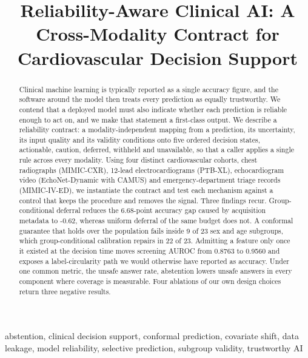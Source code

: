 \documentclass[conference,a4paper]{IEEEtran}
\begin{document}
\title{Reliability-Aware Clinical AI: A Cross-Modality Contract for Cardiovascular Decision Support}

\author{
}

\maketitle

\begin{abstract}
Clinical machine learning is typically reported as a single accuracy figure, and the software around the model then treats every prediction as equally trustworthy. We contend that a deployed model must also indicate whether each prediction is reliable enough to act on, and we make that statement a first-class output. We describe a reliability contract: a modality-independent mapping from a prediction, its uncertainty, its input quality and its validity conditions onto five ordered decision states, actionable, caution, deferred, withheld and unavailable, so that a caller applies a single rule across every modality. Using four distinct cardiovascular cohorts, chest radiographs (MIMIC-CXR), 12-lead electrocardiograms (PTB-XL), echocardiogram video (EchoNet-Dynamic with CAMUS) and emergency-department triage records (MIMIC-IV-ED), we instantiate the contract and test each mechanism against a control that keeps the procedure and removes the signal. Three findings recur. Group-conditional deferral reduces the 6.68-point accuracy gap caused by acquisition metadata to -0.62, whereas uniform deferral of the same budget does not. A conformal guarantee that holds over the population fails inside 9 of 23 sex and age subgroups, which group-conditional calibration repairs in 22 of 23. Admitting a feature only once it existed at the decision time moves screening AUROC from 0.8763 to 0.9560 and exposes a label-circularity path we would otherwise have reported as accuracy. Under one common metric, the unsafe answer rate, abstention lowers unsafe answers in every component where coverage is measurable. Four ablations of our own design choices return three negative results.
\end{abstract}

\begin{IEEEkeywords}
abstention, clinical decision support, conformal prediction, covariate shift, data leakage, model reliability, selective prediction, subgroup validity, trustworthy AI
\end{IEEEkeywords}
\end{document}
